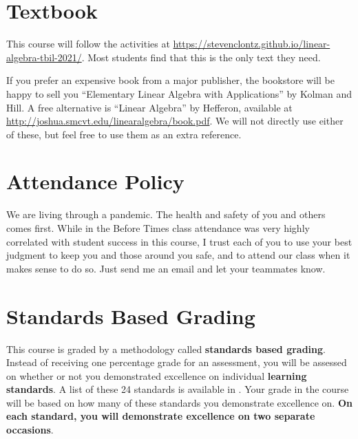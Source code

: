 \documentclass{article}
\begin{document}
\section*{\fontsize{12}{15}\selectfont Textbook}
This course will follow the activities at \url{https://stevenclontz.github.io/linear-algebra-tbil-2021/}. Most students find that this is the only text they need.

If you prefer an expensive book from a major publisher, the bookstore will be happy to sell you ``Elementary Linear Algebra with Applications'' by Kolman and Hill.  A free alternative is ``Linear Algebra'' by Hefferon, available at \url{http://joshua.smcvt.edu/linearalgebra/book.pdf}. We will not directly use either of these, but feel free to use them as an extra reference.


\section*{\fontsize{12}{15}\selectfont Attendance Policy}
We are living through a pandemic. The health and safety of you and others comes first. While in the Before Times class attendance was very highly correlated with student success in this course, I trust each of you to use your best judgment to keep you and those around you safe, and to attend our class when it makes sense to do so.  Just send me an email and let your teammates know.

\section*{\fontsize{12}{15}\selectfont Standards Based Grading}
This course is graded by a methodology called {\bf standards based grading}.  Instead of receiving one percentage grade for an assessment, you will be assessed on whether or not you demonstrated excellence on individual {\bf learning standards}.  A list of these 24 standards is available in \LMS.  Your grade in the course will be based on how many of these standards you demonstrate excellence on.  {\bf On each standard, you will demonstrate excellence on two separate occasions}.
\end{document}
